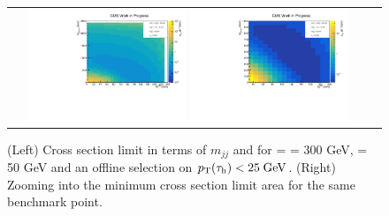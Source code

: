 \begin{figure}[tbh!]
	\centering
	\begin{tabular}{cc}
		\includegraphics[width=0.45\textwidth]{analysis/pics/JetInvMass_vs_MET_xsec_chi300_lsp050_taupt25.pdf}
		\includegraphics[width=0.45\textwidth]{analysis/pics/JetInvMass_vs_MET_xsec_chi300_lsp050_taupt25_zoom.pdf} 		
	\end{tabular}
	\caption{(Left) Cross section limit in terms of $m_{jj}$ and \met for \charginopm = \neutralinotwo = 300 GeV, \neutralinoone = 50 GeV and an offline selection on $p_{\text{T}}(\tau_{\text{h}}) <  25\;\text{Ge}\kern-0.06667em\text{V}$. (Right) Zooming into the minimum cross section limit area for the same benchmark point.}
	\label{fig::JetInvMass_vs_MET_xsec_chi300_lsp050_taupt25}
\end{figure}

